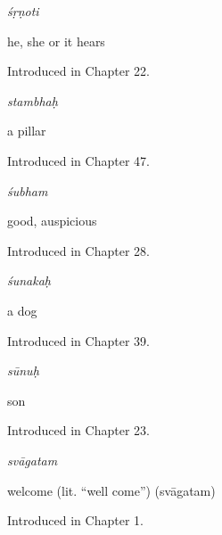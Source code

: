 \noindent\begin{minipage}[t]{\linewidth}
\raggedright
\textbf{}\enspace\emph{śṛṇoti}\par
\small he, she or it hears\par
\footnotesize Introduced in Chapter 22.
\end{minipage}\par\medskip

\noindent\begin{minipage}[t]{\linewidth}
\raggedright
\textbf{}\enspace\emph{stambhaḥ}\par
\small a pillar\par
\footnotesize Introduced in Chapter 47.
\end{minipage}\par\medskip

\noindent\begin{minipage}[t]{\linewidth}
\raggedright
\textbf{}\enspace\emph{śubham}\par
\small good, auspicious\par
\footnotesize Introduced in Chapter 28.
\end{minipage}\par\medskip

\noindent\begin{minipage}[t]{\linewidth}
\raggedright
\textbf{}\enspace\emph{śunakaḥ}\par
\small a dog\par
\footnotesize Introduced in Chapter 39.
\end{minipage}\par\medskip

\noindent\begin{minipage}[t]{\linewidth}
\raggedright
\textbf{}\enspace\emph{sūnuḥ}\par
\small son\par
\footnotesize Introduced in Chapter 23.
\end{minipage}\par\medskip

\noindent\begin{minipage}[t]{\linewidth}
\raggedright
\textbf{}\enspace\emph{svāgatam}\par
\small welcome (lit. \textquotedblleft{}well come\textquotedblright{}) (svāgatam)\par
\footnotesize Introduced in Chapter 1.
\end{minipage}\par\medskip

